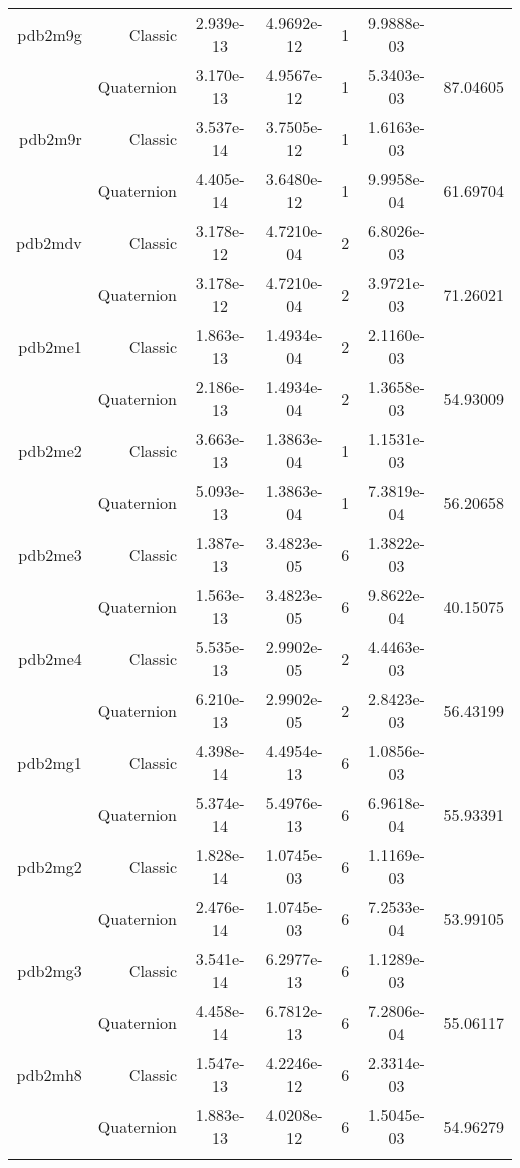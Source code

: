 \begin{xltabular}{\textwidth}{r|rS[table-format=1.3e+2]S[table-format=1.4e+2]cS[table-format=1.4e+2]S[table-format=-1.5]}
pdb2m9g & Classic & 2.939e-13 & 4.9692e-12 & 1 & 9.9888e-03 & \\
& Quaternion & 3.170e-13 & 4.9567e-12 & 1 & 5.3403e-03 & 87.04605\\  \addlinespace
pdb2m9r & Classic & 3.537e-14 & 3.7505e-12 & 1 & 1.6163e-03 & \\
& Quaternion & 4.405e-14 & 3.6480e-12 & 1 & 9.9958e-04 & 61.69704\\  \addlinespace
pdb2mdv & Classic & 3.178e-12 & 4.7210e-04 & 2 & 6.8026e-03 & \\
& Quaternion & 3.178e-12 & 4.7210e-04 & 2 & 3.9721e-03 & 71.26021\\  \addlinespace
pdb2me1 & Classic & 1.863e-13 & 1.4934e-04 & 2 & 2.1160e-03 & \\
& Quaternion & 2.186e-13 & 1.4934e-04 & 2 & 1.3658e-03 & 54.93009\\  \addlinespace
pdb2me2 & Classic & 3.663e-13 & 1.3863e-04 & 1 & 1.1531e-03 & \\
& Quaternion & 5.093e-13 & 1.3863e-04 & 1 & 7.3819e-04 & 56.20658\\  \addlinespace
pdb2me3 & Classic & 1.387e-13 & 3.4823e-05 & 6 & 1.3822e-03 & \\
& Quaternion & 1.563e-13 & 3.4823e-05 & 6 & 9.8622e-04 & 40.15075\\  \addlinespace
pdb2me4 & Classic & 5.535e-13 & 2.9902e-05 & 2 & 4.4463e-03 & \\
& Quaternion & 6.210e-13 & 2.9902e-05 & 2 & 2.8423e-03 & 56.43199\\  \addlinespace
pdb2mg1 & Classic & 4.398e-14 & 4.4954e-13 & 6 & 1.0856e-03 & \\
& Quaternion & 5.374e-14 & 5.4976e-13 & 6 & 6.9618e-04 & 55.93391\\  \addlinespace
pdb2mg2 & Classic & 1.828e-14 & 1.0745e-03 & 6 & 1.1169e-03 & \\
& Quaternion & 2.476e-14 & 1.0745e-03 & 6 & 7.2533e-04 & 53.99105\\  \addlinespace
pdb2mg3 & Classic & 3.541e-14 & 6.2977e-13 & 6 & 1.1289e-03 & \\
& Quaternion & 4.458e-14 & 6.7812e-13 & 6 & 7.2806e-04 & 55.06117\\  \addlinespace
pdb2mh8 & Classic & 1.547e-13 & 4.2246e-12 & 6 & 2.3314e-03 & \\
& Quaternion & 1.883e-13 & 4.0208e-12 & 6 & 1.5045e-03 & 54.96279\\  \addlinespace

\end{xltabular}
